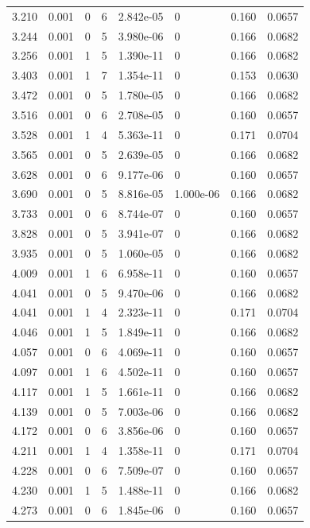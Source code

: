 \documentclass[preview]{standalone}
\begin{document}
{{{\begin{tabular}{L{1.2cm}C{1.2cm} C{0.3cm}C{0.5cm} C{1.4cm}C{1.4cm} C{1.4cm}C{1.4cm}}
  3.210  &  0.001  & 0     &  6 &  2.842e-05  & 0  & 0.160 &  0.0657   \\ 
  3.244  &  0.001  & 0     &  5 &  3.980e-06  & 0  & 0.166 &  0.0682   \\ 
  3.256  &  0.001  & 1     &  5 &  1.390e-11  & 0  & 0.166 &  0.0682   \\ 
  3.403  &  0.001  & 1     &  7 &  1.354e-11  & 0  & 0.153 &  0.0630   \\ 
  3.472  &  0.001  & 0     &  5 &  1.780e-05  & 0  & 0.166 &  0.0682   \\ 
  3.516  &  0.001  & 0     &  6 &  2.708e-05  & 0  & 0.160 &  0.0657   \\ 
  3.528  &  0.001  & 1     &  4 &  5.363e-11  & 0  & 0.171 &  0.0704   \\ 
  3.565  &  0.001  & 0     &  5 &  2.639e-05  & 0  & 0.166 &  0.0682   \\ 
  3.628  &  0.001  & 0     &  6 &  9.177e-06  & 0  & 0.160 &  0.0657   \\ 
  3.690  &  0.001  & 0     &  5 &  8.816e-05  & 1.000e-06  & 0.166 &  0.0682   \\ 
  3.733  &  0.001  & 0     &  6 &  8.744e-07  & 0  & 0.160 &  0.0657   \\ 
  3.828  &  0.001  & 0     &  5 &  3.941e-07  & 0  & 0.166 &  0.0682   \\ 
  3.935  &  0.001  & 0     &  5 &  1.060e-05  & 0  & 0.166 &  0.0682   \\ 
  4.009  &  0.001  & 1     &  6 &  6.958e-11  & 0  & 0.160 &  0.0657   \\ 
  4.041  &  0.001  & 0     &  5 &  9.470e-06  & 0  & 0.166 &  0.0682   \\ 
  4.041  &  0.001  & 1     &  4 &  2.323e-11  & 0  & 0.171 &  0.0704   \\ 
  4.046  &  0.001  & 1     &  5 &  1.849e-11  & 0  & 0.166 &  0.0682   \\ 
  4.057  &  0.001  & 0     &  6 &  4.069e-11  & 0  & 0.160 &  0.0657   \\ 
  4.097  &  0.001  & 1     &  6 &  4.502e-11  & 0  & 0.160 &  0.0657   \\ 
  4.117  &  0.001  & 1     &  5 &  1.661e-11  & 0  & 0.166 &  0.0682   \\ 
  4.139  &  0.001  & 0     &  5 &  7.003e-06  & 0  & 0.166 &  0.0682   \\ 
  4.172  &  0.001  & 0     &  6 &  3.856e-06  & 0  & 0.160 &  0.0657   \\ 
  4.211  &  0.001  & 1     &  4 &  1.358e-11  & 0  & 0.171 &  0.0704   \\ 
  4.228  &  0.001  & 0     &  6 &  7.509e-07  & 0  & 0.160 &  0.0657   \\ 
  4.230  &  0.001  & 1     &  5 &  1.488e-11  & 0  & 0.166 &  0.0682   \\ 
  4.273  &  0.001  & 0     &  6 &  1.845e-06  & 0  & 0.160 &  0.0657   \\ 
\hline 
\end{tabular} 

}}}
\end{document}
